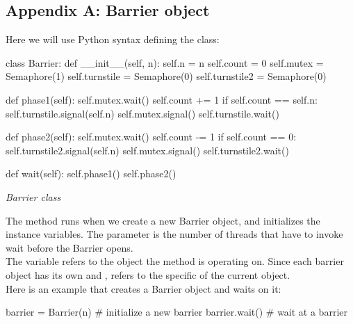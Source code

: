 \documentclass[a4paper, 10pt]{article}
\begin{document}
\subsection{Appendix A: Barrier object}\label{a:A}
\quad Here we will use Python syntax defining the class: 
\begin{mycodeblock}
class Barrier:
    def __init__(self, n):
        self.n = n
        self.count = 0
        self.mutex = Semaphore(1)
        self.turnstile = Semaphore(0)
        self.turnstile2 = Semaphore(0)

    def phase1(self):
        self.mutex.wait()
        self.count += 1
        if self.count == self.n:
            self.turnstile.signal(self.n)
        self.mutex.signal()
        self.turnstile.wait()

    def phase2(self):
        self.mutex.wait()
        self.count -= 1
        if self.count == 0:
            self.turnstile2.signal(self.n)
        self.mutex.signal()
        self.turnstile2.wait()

    def wait(self):
        self.phase1()
        self.phase2()
\end{mycodeblock}
\begin{center}
    \textit{Barrier class}
\end{center}
The {} method runs when we create a new Barrier object, and initializes the instance variables. The parameter {} is the number of threads that
have to invoke wait before the Barrier opens.\\
The variable {} refers to the object the method is operating on. Since
each barrier object has its own {} and {}, {} refers to the
specific {} of the current object.\\
Here is an example that creates a Barrier object and waits on it:
\begin{mycodeblock}
barrier = Barrier(n)     # initialize a new barrier
barrier.wait()           # wait at a barrier
\end{mycodeblock}
\nocite{OperatingSystemConcept}
\nocite{OSM}
\nocite{LBS}


\end{document}
